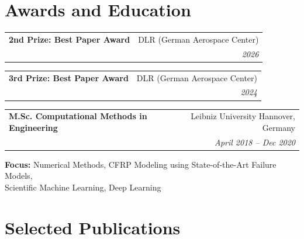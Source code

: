 \documentclass[a4paper,20pt]{article}
\makeatletter
\newcommand{\resumeSubheading}[4]{
  \vspace{-1pt}\item
    \begin{tabular*}{0.97\textwidth}{l@{\extracolsep{\fill}}r}
      \textbf{#1} & #2 \\
      \textit{#3} & \textit{#4} \\
    \end{tabular*}\vspace{-5pt}
}
\makeatother
\begin{document}
\vspace{0.2cm}
\vspace{5pt}

\newpage

\section{\color{blue}Awards and Education}

\resumeSubheading
  {\textcolor{green!50!black}{\faAward} \textbf{2nd Prize: Best Paper Award}}
  {DLR (German Aerospace Center)}{}{2026}
\resumeSubheading
  {\textcolor{green!50!black}{\faAward} \textbf{3rd Prize: Best Paper Award}}
  {DLR (German Aerospace Center)}{}{2024}
\vspace{4pt}

\resumeSubheading
  {\textcolor{green!50!black}{M.Sc.} Computational Methods in Engineering}
  {Leibniz University Hannover, Germany}{}{April 2018 -- Dec 2020}
  \vspace{2pt}

\noindent\parbox{\textwidth}{\textbf{Focus:} Numerical Methods, CFRP Modeling using State-of-the-Art Failure Models,\\ Scientific Machine Learning, Deep Learning}
\vspace{4pt}
\section{\color{blue}Selected Publications}
\end{document}
